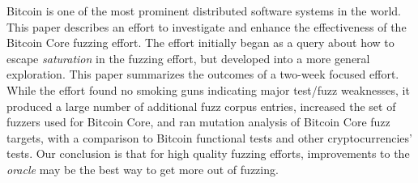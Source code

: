 Bitcoin is one of the most prominent distributed software systems in the world.  This paper describes an effort to investigate and enhance the effectiveness of the Bitcoin Core fuzzing effort.  The effort initially began as a query about how to escape \emph{saturation} in the fuzzing effort, but developed into a more general exploration.  This paper summarizes the outcomes of a two-week focused effort.  While the effort found no smoking guns indicating major test/fuzz weaknesses, it produced a large number of additional fuzz corpus entries, increased the set of fuzzers used for Bitcoin Core, and ran mutation analysis of Bitcoin Core fuzz targets, with a comparison to Bitcoin functional tests and other cryptocurrencies' tests. Our conclusion is that for high quality fuzzing efforts, improvements to the \emph{oracle} may be the best way to get more out of fuzzing.
